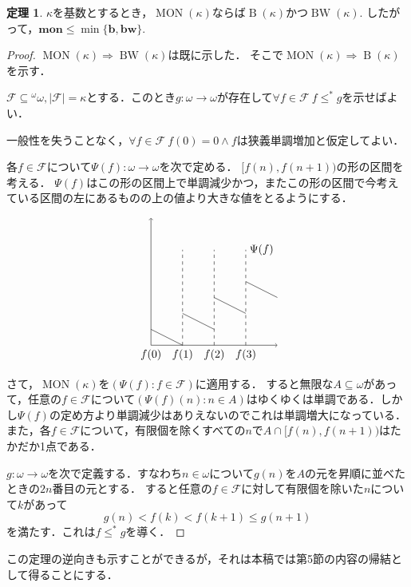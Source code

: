 \documentclass[uplatex,dvipdfmx]{jsarticle}
\renewcommand\subset{\subseteq}
\newcommand{\BW}{\operatorname{BW}}
\newcommand{\B}{\operatorname{B}}
\newcommand{\MON}{\operatorname{MON}}
\theoremstyle{definition}
\newtheorem*{thm*}{定理}
\theoremstyle{named}
\begin{document}
\begin{framed}
\begin{thm*}
$\kappa$を基数とするとき，$\MON(\kappa)$ならば$\B(\kappa)$かつ$\BW(\kappa)$.
したがって，$\mathbf{mon} \le \min\{\mathbf{b}, \mathbf{bw}\}$.
\end{thm*}
\end{framed}
\begin{proof}
$\MON(\kappa) \Rightarrow \BW(\kappa)$は既に示した．
そこで$\MON(\kappa) \Rightarrow \B(\kappa)$を示す．

$\mathcal{F} \subset {}^\omega \omega, |\mathcal{F}| = \kappa$とする．このとき$g: \omega \to \omega$が存在して$\forall f \in \mathcal{F}\ f \le^\ast g$を示せばよい．

一般性を失うことなく，$\forall f \in \mathcal{F}\ f(0) = 0 \land \text{$f$は狭義単調増加}$と仮定してよい．

各$f \in \mathcal{F}$について$\Psi(f): \omega \to \omega$を次で定める．
$[f(n), f(n+1))$の形の区間を考える．
$\Psi(f)$はこの形の区間上で単調減少かつ，またこの形の区間で今考えている区間の左にあるものの上の値より大きな値をとるようにする．

\[
\begin{tikzpicture}
\draw[->] (0,0) -- (0,4);
\draw[->] (0,0) -- (4,0);
\draw (0,0.5) -- (1,0);
\draw (1,1) -- (2,0.5);
\draw (2,1.5) -- (3,1);
\draw (3,2) -- (4,1.5);
\draw[dashed] (1,0) -- (1,3);
\draw[dashed] (2,0) -- (2,3);
\draw[dashed] (3,0) -- (3,3);

\node[below] at (0,0) {$f(0)$};
\node[below] at (1,0) {$f(1)$};
\node[below] at (2,0) {$f(2)$};
\node[below] at (3,0) {$f(3)$};
\node at (3.5,3) {$\Psi(f)$};
\end{tikzpicture}
\]

さて，$\MON(\kappa)$を$(\Psi(f) : f \in \mathcal{F})$に適用する．
すると無限な$A \subset \omega$があって，任意の$f \in \mathcal{F}$について$(\Psi(f)(n) : n \in A)$はゆくゆくは単調である．しかし$\Psi(f)$の定め方より単調減少はありえないのでこれは単調増大になっている．
また，各$f \in \mathcal{F}$について，有限個を除くすべての$n$で$A \cap [f(n), f(n+1))$はたかだか1点である．

$g: \omega \to \omega$を次で定義する．すなわち$n\in \omega$について$g(n)$を$A$の元を昇順に並べたときの$2n$番目の元とする．
すると任意の$f \in \mathcal{F}$に対して有限個を除いた$n$について$k$があって
\[
g(n) < f(k) < f(k+1) \le g(n+1)
\]
を満たす．これは$f \le^\ast g$を導く．
\end{proof}

この定理の逆向きも示すことができるが，それは本稿では第5節の内容の帰結として得ることにする．
\end{document}
